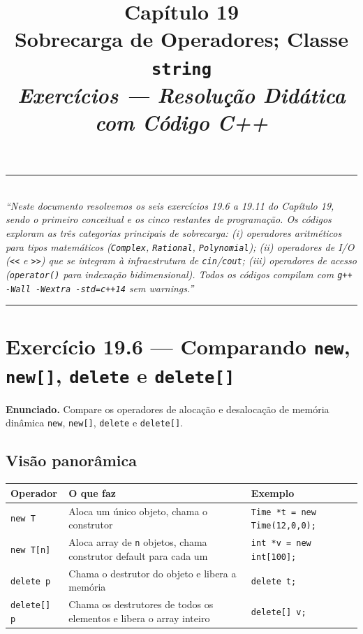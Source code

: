 \documentclass[11pt,a4paper]{article}
\title{
  \vspace{-1cm}
  {\Huge\bfseries\color{deitelblue} Cap\'itulo 19}\\[0.3em]
  {\Large\bfseries Sobrecarga de Operadores; Classe \texttt{string}}\\[0.8em]
  {\large\itshape Exerc\'icios --- Resolu\c{c}\~ao Did\'atica com C\'odigo C++}
}
\author{}
\date{}
\begin{document}
\maketitle
\thispagestyle{empty}
\vspace{-2em}

\begin{center}
\rule{0.85\textwidth}{0.5pt}\\[0.4em]
\textit{``Neste documento resolvemos os seis exerc\'icios 19.6 a 19.11 do Cap\'itulo 19, sendo o primeiro conceitual e os cinco restantes de programa\c{c}\~ao. Os c\'odigos exploram as tr\^es categorias principais de sobrecarga: (i) operadores aritm\'eticos para tipos matem\'aticos (\texttt{Complex}, \texttt{Rational}, \texttt{Polynomial}); (ii) operadores de I/O (\texttt{<<} e \texttt{>>}) que se integram \`a infraestrutura de \texttt{cin}/\texttt{cout}; (iii) operadores de acesso (\texttt{operator()} para indexa\c{c}\~ao bidimensional). Todos os c\'odigos compilam com \texttt{g++ -Wall -Wextra -std=c++14} sem warnings.''}\\[0.4em]
\rule{0.85\textwidth}{0.5pt}
\end{center}

\vspace{1em}

\section{Exerc\'icio 19.6 --- Comparando \texttt{new}, \texttt{new[]}, \texttt{delete} e \texttt{delete[]}}

\begin{enunciado}
\textbf{Enunciado.} Compare os operadores de aloca\c{c}\~ao e desaloca\c{c}\~ao de mem\'oria din\^amica \texttt{new}, \texttt{new[]}, \texttt{delete} e \texttt{delete[]}.
\end{enunciado}

\subsection*{Vis\~ao panor\^amica}

\begin{center}
\renewcommand{\arraystretch}{1.4}
\begin{tabular}{|l|p{4.5cm}|p{6.5cm}|}
\hline
\textbf{Operador} & \textbf{O que faz} & \textbf{Exemplo} \\
\hline
\texttt{new T} & Aloca um \'unico objeto, chama o construtor & \texttt{Time *t = new Time(12,0,0);} \\
\hline
\texttt{new T[n]} & Aloca array de \texttt{n} objetos, chama construtor default para cada um & \texttt{int *v = new int[100];} \\
\hline
\texttt{delete p} & Chama o destrutor do objeto e libera a mem\'oria & \texttt{delete t;} \\
\hline
\texttt{delete[] p} & Chama os destrutores de todos os elementos e libera o array inteiro & \texttt{delete[] v;} \\
\hline
\end{tabular}
\end{center}
\end{document}
